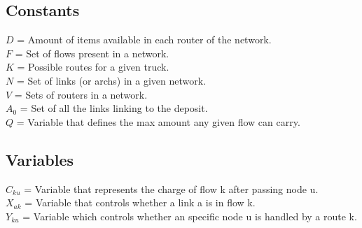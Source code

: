 \subsection{Constants}
$D$ = Amount of items available in each router of the network. \\
$F$ = Set of flows present in a network. \\
$K$ = Possible routes for a given truck. \\
$N$ = Set of links (or archs) in a given network. \\
$V$ = Sets of routers in a network. \\
$A_0$ = Set of all the links linking to the deposit. \\
$Q$ = Variable that defines the max amount any given flow can carry.

\subsection{Variables}
$C_{ku}$ =  Variable that represents the charge of flow k after passing node u. \\
$X_{ak}$ =  Variable that controls whether a link a is in flow k. \\ 
$Y_{ku}$ =  Variable which controls whether an specific node u is handled by a route k.\\

